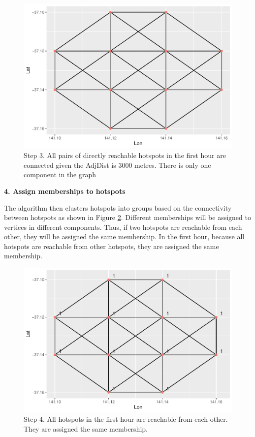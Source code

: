 \begin{Schunk}
\begin{figure}
\includegraphics[width=0.8\linewidth]{clustering_paper_files/figure-latex/step3-1} \caption[Step 3]{Step 3. All pairs of directly reachable hotspots in the first hour are connected given the AdjDist is 3000 metres. There is only one component in the graph}\label{fig:step3}
\end{figure}
\end{Schunk}

\textbf{4. Assign memberships to hotspots}

The algorithm then clusters hotspots into groups based on the
connectivity between hotspots as shown in Figure \ref{fig:step4}.
Different memberships will be assigned to vertices in different
components. Thus, if two hotspots are reachable from each other, they
will be assigned the same membership. In the first hour, because all
hotspots are reachable from other hotspots, they are assigned the same
membership.

\begin{Schunk}
\begin{figure}
\includegraphics[width=0.8\linewidth]{clustering_paper_files/figure-latex/step4-1} \caption[Step 4]{Step 4. All hotspots in the first hour are reachable from each other. They are assigned the same membership.}\label{fig:step4}
\end{figure}
\end{Schunk}


